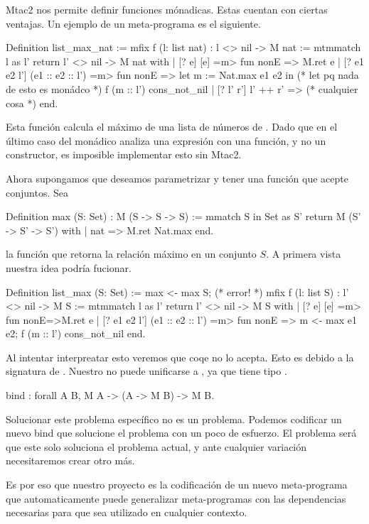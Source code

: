 Mtac2 nos permite definir funciones mónadicas. Estas cuentan con ciertas ventajas. Un ejemplo de un meta-programa es el siguiente.

\begin{coqe}
Definition list_max_nat :=
  mfix f (l: list nat) : l <> nil -> M nat :=
    mtmmatch l as l' return l' <> nil -> M nat with
    | [? e] [e] =m> fun nonE => M.ret e
    | [? e1 e2 l'] (e1 :: e2 :: l') =m> fun nonE =>
      let m := Nat.max e1 e2 in (* let pq nada de esto es monádco *)
      f (m :: l') cons_not_nil
    | [? l' r'] l' ++ r' => (* cualquier cosa *) 
    end.
\end{coqe}

Esta función calcula el máximo de una lista de números de \nat. Dado que en el último caso del  monádico analiza una expresión
con una función, y no un constructor, es imposible implementar esto sin Mtac2.

Ahora supongamos que deseamos parametrizar \nat y tener una función que acepte conjuntos. Sea
\begin{coqe}
Definition max (S: Set) : M (S -> S -> S) :=
  mmatch S in Set as S' return M (S' -> S' -> S') with
  | nat => M.ret Nat.max
  end.
\end{coqe}

la función que retorna la relación máximo en un conjunto $S$. A primera vista nuestra idea podría fucionar.

\begin{coqe}
Definition list_max (S: Set)  :=
  max <- max S; (* error! *)
  mfix f (l: list S) : l' <> nil -> M S :=
    mtmmatch l as l' return l' <> nil -> M S with
    | [? e] [e] =m> fun nonE=>M.ret e
    | [? e1 e2 l'] (e1 :: e2 :: l') =m> fun nonE =>
      m <- max e1 e2;
      f (m :: l') cons_not_nil
    end.
\end{coqe}

Al intentar interpreatar esto veremos que coqe no lo acepta. Esto es debido a la signatura de . Nuestro  no puede
unificarse a , ya que tiene tipo .

\begin{coqe}
bind : forall A B, M A -> (A -> M B) -> M B.
\end{coqe}

Solucionar este problema específico no es un problema. Podemos codificar un nuevo bind que solucione el problema con un poco de esfuerzo.
El problema será que este solo soluciona el problema actual, y ante cualquier variación necesitaremos crear otro  más.

Es por eso que nuestro proyecto es la codificación de un nuevo meta-programa  que automaticamente puede generalizar meta-programas
con las dependencias necesarias para que sea utilizado en cualquier contexto.